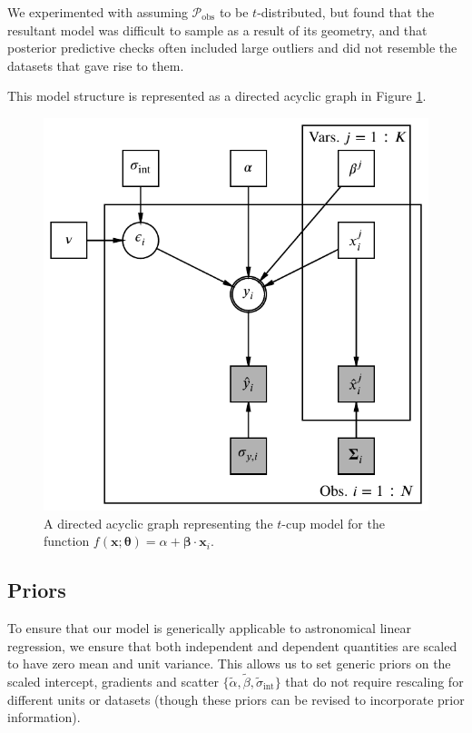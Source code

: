 \documentclass[fleqn,usenatbib]{mnras}
\newcommand{\intercept}{\alpha}
\newcommand{\covariate}{\beta}
\begin{document}
We experimented with assuming $\mathcal P_{\text{obs}}$ to be $t$-distributed,
but found that the resultant model was difficult to sample as a result of its
geometry, and that posterior predictive checks often included large outliers
and did not resemble the datasets that gave rise to them.

This model structure is represented as a directed acyclic graph in Figure
\ref{fig:formalism.dag}.

\begin{figure}
	\includegraphics[width=\columnwidth]{graphics/dag.pdf}
    \caption{A directed acyclic graph representing the $t$-cup model for the
    function $f(\boldsymbol{x}; \boldsymbol{\theta}) = \alpha +
    \boldsymbol{\beta} \cdot \boldsymbol{x}_i$.}
    \label{fig:formalism.dag}
\end{figure}

\subsection{Priors}
\label{sec:formalism.prior}

To ensure that our model is generically applicable to astronomical linear
regression, we ensure that both independent and dependent quantities are scaled
to have zero mean and unit variance. This allows us to set generic priors on the
scaled intercept, gradients and scatter $\{\tilde{\intercept},
\tilde{\covariate}, \tilde{\sigma}_{\text{int}}\}$ that do not require rescaling for
different units or datasets (though these priors can be revised to incorporate
prior information).
\end{document}
